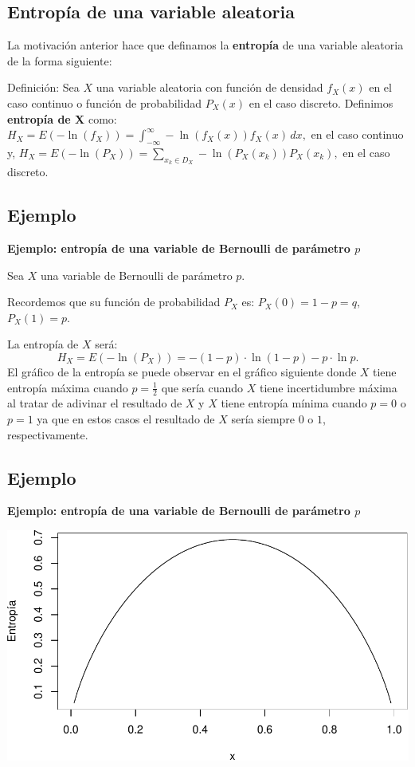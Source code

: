 \documentclass[]{book}
\begin{document}
\hypertarget{entropuxeda-de-una-variable-aleatoria-2}{%
\subsection{Entropía de una variable aleatoria}\label{entropuxeda-de-una-variable-aleatoria-2}}

La motivación anterior hace que definamos la \textbf{entropía} de una variable aleatoria de la forma siguiente:

Definición:
Sea \(X\) una variable aleatoria con función de densidad \(f_X(x)\) en el caso continuo o función de probabilidad \(P_X(x)\) en el caso discreto. Definimos \textbf{entropía de X} como:
\(H_X = E\left(-\ln(f_X)\right)=\int_{-\infty}^\infty -\ln(f_X(x)) f_X(x)\, dx,\) en el caso continuo y,
\(H_X = E\left(-\ln(P_X)\right)=\sum_{x_k\in D_X} -\ln(P_X(x_k)) P_X(x_k),\) en el caso discreto.

\hypertarget{ejemplo-36}{%
\subsection{Ejemplo}\label{ejemplo-36}}

\textbf{Ejemplo: entropía de una variable de Bernoulli de parámetro \(p\)}

Sea \(X\) una variable de Bernoulli de parámetro \(p\).

Recordemos que su función de probabilidad \(P_X\) es: \(P_X(0)=1-p=q,\) \(P_X(1)=p\).

La entropía de \(X\) será:
\[
H_X = E\left(-\ln(P_X)\right) = -(1-p)\cdot \ln(1-p)-p\cdot \ln p.
\]
El gráfico de la entropía se puede observar en el gráfico siguiente donde \(X\) tiene entropía máxima cuando \(p=\frac{1}{2}\) que sería cuando \(X\) tiene incertidumbre máxima al tratar de adivinar el resultado de \(X\) y \(X\) tiene entropía mínima cuando \(p=0\) o \(p=1\) ya que en estos casos el resultado de \(X\) sería siempre \(0\) o \(1\), respectivamente.

\hypertarget{ejemplo-37}{%
\subsection{Ejemplo}\label{ejemplo-37}}

\textbf{Ejemplo: entropía de una variable de Bernoulli de parámetro \(p\)}

\includegraphics{curso-probabilidad-udemy_files/figure-latex/unnamed-chunk-115-1.pdf}
\end{document}

